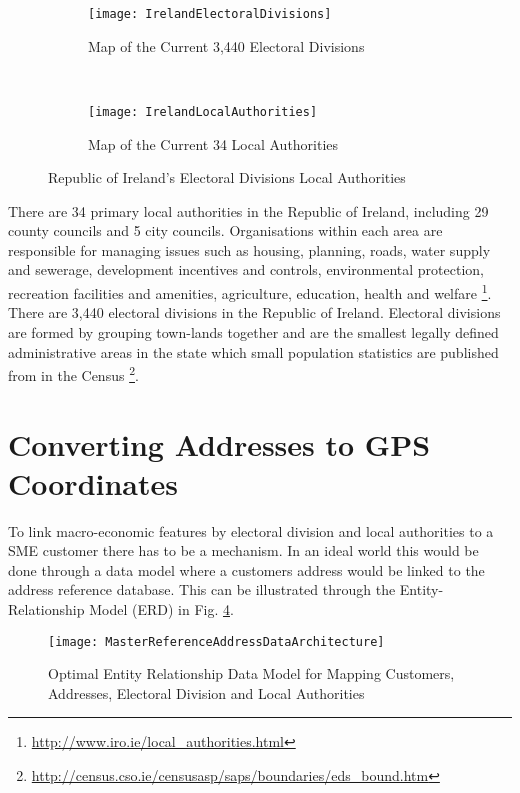 \begin{figure}[H]
	\begin{subfigure}[b]{0.5\textwidth}
		\captionsetup{font=scriptsize}
		\texttt{[image: IrelandElectoralDivisions]}
		\caption{Map of the Current 3,440 Electoral Divisions}\label{fig:IrelandElectoralDivisions}
	\end{subfigure} ~\quad
	\begin{subfigure}[b]{0.5\textwidth}
		\captionsetup{font=scriptsize}
		\texttt{[image: IrelandLocalAuthorities]}
		\caption{Map of the Current 34 Local Authorities}\label{fig:IrelandLocalAuthorities}
	\end{subfigure}
	\caption{Republic of Ireland's Electoral Divisions Local Authorities}
	\label{fig:Ireland_ED_LA_Example}
\end{figure}

There are 34 primary local authorities in the Republic of Ireland, including 29 county councils and 5 city councils. Organisations within each area are responsible for managing issues such as housing, planning, roads, water supply and sewerage, development incentives and controls, environmental protection, recreation facilities and amenities, agriculture, education, health and welfare \footnote{\url{http://www.iro.ie/local_authorities.html}}. There are 3,440 electoral divisions in the Republic of Ireland. Electoral divisions are formed by grouping town-lands together and are the smallest legally defined administrative areas in the state which small population statistics are published from in the Census \footnote{\url{http://census.cso.ie/censusasp/saps/boundaries/eds_bound.htm}}.


\section{Converting Addresses to GPS Coordinates}
To link macro-economic features by electoral division and local authorities to a SME customer there has to be a mechanism. In an ideal world this would be done through a data model where a customers address would be linked to the address reference database. This can be illustrated through the Entity-Relationship Model (ERD) in Fig. \ref{fig:MasterReferenceAddressDataArchitecture}.

\begin{figure}[H]
	\texttt{[image: MasterReferenceAddressDataArchitecture]}
	\caption{Optimal Entity Relationship Data Model for Mapping Customers, Addresses, Electoral Division and Local Authorities}
	\label{fig:MasterReferenceAddressDataArchitecture}
\end{figure}

